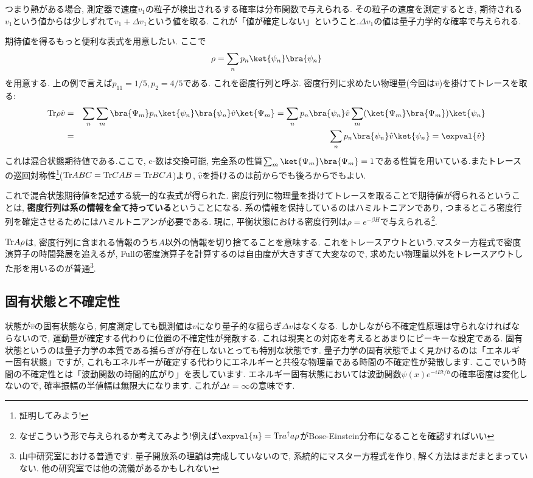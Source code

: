 \documentclass[10.5pt,a4paper]{jreport}
\begin{document}
つまり熱がある場合, 測定器で速度$v_1$の粒子が検出されるする確率は分布関数で与えられる. その粒子の速度を測定するとき, 期待される$v_1$という値からは少しずれて$v_1 + \Delta v_1$という値を取る. これが「値が確定しない」ということ.$\Delta v_1$の値は量子力学的な確率で与えられる.

期待値を得るもっと便利な表式を用意したい. ここで
\begin{eqnarray}
  \rho = \sum_np_n\ket{\psi_n}\bra{\psi_n}
\end{eqnarray}
を用意する. 上の例で言えば$p_11 = 1/5, p_2 = 4/5$である. これを密度行列と呼ぶ. 密度行列に求めたい物理量(今回は$\hat{v}$)を掛けてトレースを取る:
\begin{eqnarray}
  \nonumber    {\rm Tr}\rho\hat{v} &=& \sum_n\sum_m\bra{\Psi_m}p_n\ket{\psi_n}\bra{\psi_n}\hat{v}\ket{\Psi_m} = \sum_np_n\bra{\psi_n}\hat{v}\sum_m(\ket{\Psi_m}\bra{\Psi_m})\ket{\psi_n}\\
  &=&\sum_np_n\bra{\psi_n}\hat{v}\ket{\psi_n} = \expval{\hat{v}}
\end{eqnarray}
これは混合状態期待値である.ここで, c-数は交換可能, 完全系の性質$\sum_m\ket{\Psi_m}\bra{\Psi_m} = 1$である性質を用いている.またトレースの巡回対称性\footnote{証明してみよう!}(${\rm Tr}ABC = {\rm Tr}CAB = {\rm Tr}BCA$)より, $\hat{v}$を掛けるのは前からでも後ろからでもよい.

これで混合状態期待値を記述する統一的な表式が得られた. 密度行列に物理量を掛けてトレースを取ることで期待値が得られるということは, {\bf 密度行列は系の情報を全て持っている}ということになる. 系の情報を保持しているのはハミルトニアンであり, つまるところ密度行列を確定させるためにはハミルトニアンが必要である. 現に, 平衡状態における密度行列は$\rho = e^{-\beta H}$で与えられる\footnote{なぜこういう形で与えられるか考えてみよう!例えば$\expval{n} = {\rm Tr}a^\dagger a\rho$がBose-Einstein分布になることを確認すればいい}.

${\rm Tr}A\rho$は, 密度行列に含まれる情報のうち$A$以外の情報を切り捨てることを意味する. これをトレースアウトという.マスター方程式で密度演算子の時間発展を追えるが, Fullの密度演算子を計算するのは自由度が大きすぎて大変なので, 求めたい物理量以外をトレースアウトした形を用いるのが普通\footnote{山中研究室における普通です. 量子開放系の理論は完成していないので, 系統的にマスター方程式を作り, 解く方法はまだまとまっていない. 他の研究室では他の流儀があるかもしれない}.
\subsection{固有状態と不確定性}
状態が$\hat{v}$の固有状態なら, 何度測定しても観測値は$v$になり量子的な揺らぎ$\Delta v$はなくなる. しかしながら不確定性原理は守られなければならないので, 運動量が確定する代わりに位置の不確定性が発散する. これは現実との対応を考えるとあまりにピーキーな設定である. 固有状態というのは量子力学の本質である揺らぎが存在しないとっても特別な状態です. 量子力学の固有状態でよく見かけるのは「エネルギー固有状態」ですが, これもエネルギーが確定する代わりにエネルギーと共役な物理量である時間の不確定性が発散します. ここでいう時間の不確定性とは「波動関数の時間的広がり」を表しています. エネルギー固有状態においては波動関数$\psi(x) e^{-iEt/\hbar}$の確率密度は変化しないので, 確率振幅の半値幅は無限大になります. これが$\Delta t = \infty$の意味です.
\end{document}
